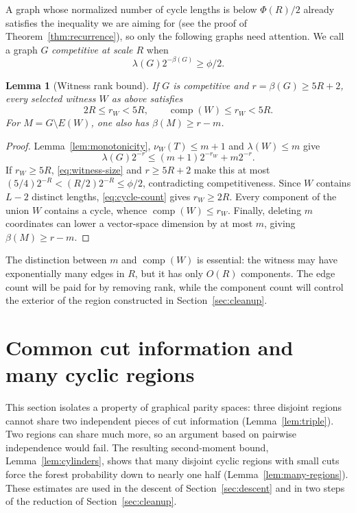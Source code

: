 \documentclass[11pt,a4paper]{article}
\numberwithin{equation}{section}
\newtheorem{lemma}[theorem]{Lemma}
\theoremstyle{definition}
\theoremstyle{remark}
\newcommand{\cc}{\operatorname{comp}}
\begin{document}
A graph whose normalized number of cycle lengths is below $\Phi(R)/2$ already satisfies the inequality we are aiming for (see the proof of Theorem~\ref{thm:recurrence}), so only the following graphs need attention. We call a graph $G$ \emph{competitive at scale $R$} when
\begin{equation}\label{eq:competitive}
 \lambda(G)2^{-\beta(G)}\ge\phi/2.
\end{equation}
\begin{lemma}[Witness rank bound]\label{lem:screen}
If $G$ is competitive and $r=\beta(G)\ge5R+2$, every selected witness $W$ as above satisfies
\begin{equation}\label{eq:witness-screen}
 2R\le r_W<5R,\qquad \cc(W)\le r_W<5R.
\end{equation}
For $M=G\setminus E(W)$, one also has $\beta(M)\ge r-m$.
\end{lemma}
\begin{proof}
Lemma~\ref{lem:monotonicity}, $\nu_W(T)\le m+1$ and $\lambda(W)\le m$ give
\[
 \lambda(G)2^{-r}\le(m+1)2^{-r_W}+m2^{-r}.
\]
If $r_W\ge5R$, \eqref{eq:witness-size} and $r\ge5R+2$ make this at most
$(5/4)2^{-R}<(R/2)2^{-R}\le\phi/2$, contradicting competitiveness. Since $W$ contains $L-2$ distinct lengths, \eqref{eq:cycle-count} gives $r_W\ge2R$. Every component of the union $W$ contains a cycle, whence $\cc(W)\le r_W$. Finally, deleting $m$ coordinates can lower a vector-space dimension by at most $m$, giving $\beta(M)\ge r-m$.
\end{proof}

The distinction between $m$ and $\cc(W)$ is essential: the witness may have exponentially many edges in $R$, but it has only $O(R)$ components. The edge count will be paid for by removing rank, while the component count will control the exterior of the region constructed in Section~\ref{sec:cleanup}.

\section{Common cut information and many cyclic regions}\label{sec:graphical}
This section isolates a property of graphical parity spaces: three disjoint regions cannot share two independent pieces of cut information (Lemma~\ref{lem:triple}). Two regions can share much more, so an argument based on pairwise independence would fail. The resulting second-moment bound, Lemma~\ref{lem:cylinders}, shows that many disjoint cyclic regions with small cuts force the forest probability down to nearly one half (Lemma~\ref{lem:many-regions}). These estimates are used in the descent of Section~\ref{sec:descent} and in two steps of the reduction of Section~\ref{sec:cleanup}.
\end{document}
